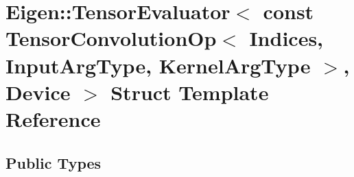 \hypertarget{struct_eigen_1_1_tensor_evaluator_3_01const_01_tensor_convolution_op_3_01_indices_00_01_input_ar27ed28dccb4630db304c3ad822c3d857}{}\section{Eigen\+:\+:Tensor\+Evaluator$<$ const Tensor\+Convolution\+Op$<$ Indices, Input\+Arg\+Type, Kernel\+Arg\+Type $>$, Device $>$ Struct Template Reference}
\label{struct_eigen_1_1_tensor_evaluator_3_01const_01_tensor_convolution_op_3_01_indices_00_01_input_ar27ed28dccb4630db304c3ad822c3d857}
\subsection*{Public Types}
